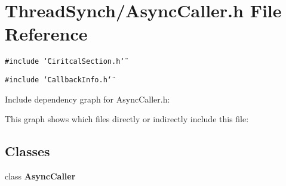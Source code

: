 \section{Thread\-Synch/Async\-Caller.h File Reference}
\label{_async_caller_8h}
{\tt \#include \char`\"{}Ciritcal\-Section.h\char`\"{}}\par
{\tt \#include \char`\"{}Callback\-Info.h\char`\"{}}\par


Include dependency graph for Async\-Caller.h:

This graph shows which files directly or indirectly include this file:\subsection*{Classes}
\begin{CompactItemize}
\item 
class {\bf Async\-Caller}
\end{CompactItemize}
